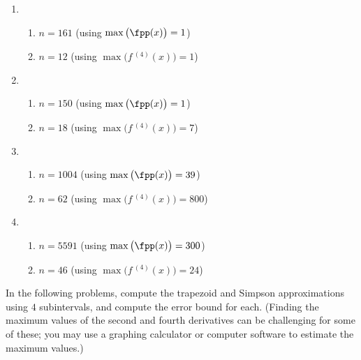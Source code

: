 \begin{enumialphparenastyle}
\begin{ex}
\begin{sol}
\begin{enumerate}
\item {\begin{enumerate}
\item		$n=161$ (using $\max\big(\fpp(x)\big)=1$)
\item		$n=12$	(using $\max\big(f\,^{(4)}(x)\big)=1$)
\end{enumerate}
}
\item {\begin{enumerate}
\item		$n=150$ (using $\max\big(\fpp(x)\big)=1$)
\item		$n=18$	(using $\max\big(f\,^{(4)}(x)\big)=7$)
\end{enumerate}
}
\item {\begin{enumerate}
\item		$n=1004$ (using $\max\big(\fpp(x)\big)=39$)
\item		$n=62$	(using $\max\big(f\,^{(4)}(x)\big)=800$)
\end{enumerate}
}
\item {\begin{enumerate}
\item		$n=5591$ (using $\max\big(\fpp(x)\big)=300$)
\item		$n=46$	(using $\max\big(f\,^{(4)}(x)\big)=24$)
\end{enumerate}
}
\end{enumerate}
\end{sol}

\end{ex}

In the following problems, compute the trapezoid and Simpson
approximations using $ 4 $ subintervals, and compute the error bound
for each. (Finding the maximum values of the second and fourth
derivatives can be challenging for some of these; you may use a
graphing calculator or computer software to estimate the maximum
values.) 










\end{enumialphparenastyle}
